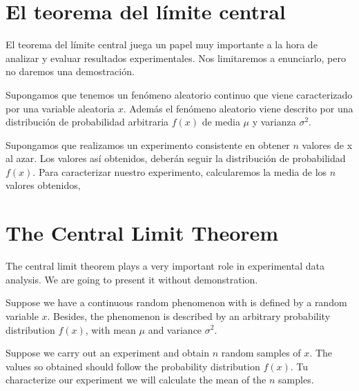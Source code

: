 \begin{paracol}{2}
\section{El teorema del límite central}\label{tlc}
El teorema del límite central juega un papel muy importante a la hora de analizar y evaluar resultados experimentales. Nos limitaremos a enunciarlo, pero no daremos una demostración.

Supongamos que tenemos un fenómeno aleatorio continuo que viene caracterizado por una variable aleatoria $x$. Además el fenómeno aleatorio viene descrito por una distribución de probabilidad arbitraria $f(x)$ de media $\mu$ y varianza $\sigma^2$.

Supongamos que realizamos un experimento consistente en obtener $n$ valores de x al azar. Los valores así obtenidos, deberán seguir la distribución de probabilidad $f(x)$. Para caracterizar nuestro experimento, calcularemos la media de los $n$ valores obtenidos,
\switchcolumn
\section{The Central Limit Theorem}
The central limit theorem plays a very important role in experimental data analysis. We are going to present it without demonstration.

Suppose we have a continuous random phenomenon with is defined by a random variable $x$. Besides, the phenomenon is described by an arbitrary probability distribution $f(x)$, with mean $\mu$ and variance $\sigma^2$.

Suppose we carry out an experiment and obtain $n$ random samples of $x$. The values so obtained should follow the probability distribution $f(x)$. Tu characterize our experiment we will calculate the mean of the $n$ samples.    

\end{paracol}

